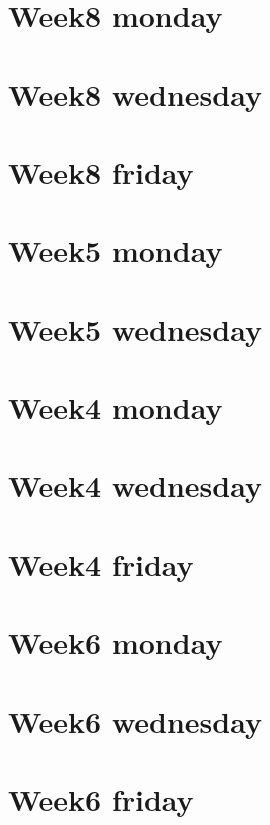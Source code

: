 
\section*{Week8 monday}

\vfill
\section*{Week8 wednesday}

\vfill
\section*{Week8 friday}

\vfill
\section*{Week5 monday}

\vfill
\section*{Week5 wednesday}

\vfill
\section*{Week4 monday}

\vfill
\section*{Week4 wednesday}

\vfill
\section*{Week4 friday}

\vfill
\section*{Week6 monday}

\vfill
\section*{Week6 wednesday}

\vfill
\section*{Week6 friday}

\vfill
